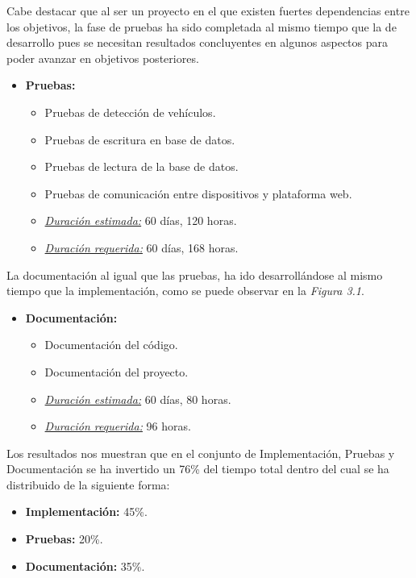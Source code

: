 Cabe destacar que al ser un proyecto en el que existen fuertes dependencias entre los objetivos, la fase de pruebas ha sido completada al mismo tiempo que la de desarrollo pues se necesitan resultados concluyentes en algunos aspectos para poder avanzar en objetivos posteriores.

\begin{itemize}
 \item \textbf{Pruebas:}
 \begin{itemize}
  \item Pruebas de detección de vehículos.
  \item Pruebas de escritura en base de datos.
  \item Pruebas de lectura de la base de datos.
  \item Pruebas de comunicación entre dispositivos y plataforma web.
  \item \underline{\textit{Duración estimada:}} 60 días, 120 horas.
  \item \underline{\textit{Duración requerida:}} 60 días, 168 horas.
 \end{itemize}
\end{itemize}

La documentación al igual que las pruebas, ha ido desarrollándose al mismo tiempo que la implementación, como se puede observar en la \textit{Figura 3.1}.

\begin{itemize}
 \item \textbf{Documentación:}
 \begin{itemize}
  \item Documentación del código.
  \item Documentación del proyecto.
  \item \underline{\textit{Duración estimada:}} 60 días, 80 horas.
  \item \underline{\textit{Duración requerida:}} 96 horas.
 \end{itemize}
\end{itemize}

\bigskip

Los resultados nos muestran que en el conjunto de Implementación, Pruebas y Documentación se ha invertido un 76\% del tiempo total dentro del cual se ha distribuido de la siguiente forma:

\begin{itemize}
  \item \textbf{Implementación: }45\%.
  \item \textbf{Pruebas: }20\%.
  \item \textbf{Documentación: }35\%.
\end{itemize}

